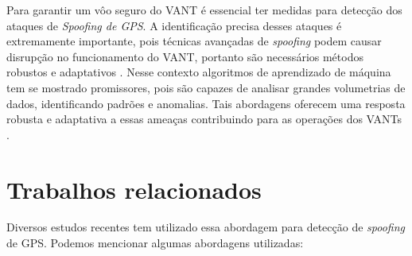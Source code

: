 \documentclass[12pt]{article}
\begin{document}
Para garantir um vôo seguro do VANT é essencial ter medidas
para detecção dos ataques de \textit{Spoofing de GPS}.
A identificação precisa desses ataques é extremamente importante,
pois técnicas avançadas de \textit{spoofing}
podem causar disrupção no funcionamento do VANT,
portanto são necessários métodos robustos e adaptativos
\cite{isleyenGPSSpoofingDetection2024}.
Nesse contexto algoritmos de aprendizado de máquina tem se mostrado promissores,
pois são capazes de analisar grandes volumetrias de dados,
identificando padrões e anomalias.
Tais abordagens oferecem uma resposta robusta e adaptativa
a essas ameaças contribuindo para as operações dos VANTs
\cite{isleyenGPSSpoofingDetection2024}.

\section{Trabalhos relacionados}

Diversos estudos recentes tem utilizado
essa abordagem para detecção de \textit{spoofing} de GPS.
Podemos mencionar algumas abordagens utilizadas:
\end{document}
